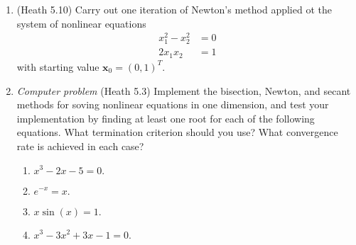 \documentclass{article}
\renewcommand{\vec}[1]{\mathbf{#1}}
\begin{document}
\begin{enumerate}
\item (Heath 5.10)  Carry out one iteration of Newton's method applied ot the system of nonlinear equations
\begin{align*}
x_1^2 - x_2^2 &= 0 \\
2 x_1 x_2 &= 1
\end{align*}
with starting value $\vec{x}_0 = ( 0, 1 )^T$.

\item \emph{Computer problem} (Heath 5.3) Implement the bisection, Newton, and secant methods for soving nonlinear equations in one dimension, and test your implementation by finding at least one
  root for each of the following equations.  What termination criterion should you use?  What convergence rate is achieved in each case?
\begin{enumerate}
\item $x^3 - 2 x - 5 = 0.$
\item $e^{-x} = x.$
\item $x \sin(x) = 1.$
\item $x^3 - 3 x^2 + 3 x - 1 = 0.$
\end{enumerate}

\end{enumerate}
\end{document}
